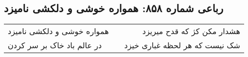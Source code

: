 \begin{center}
\section*{رباعی شماره ۸۵۸: همواره خوشی و دلکشی نامیزد}
\label{sec:0858}
\begin{longtable}{l p{0.5cm} r}
همواره خوشی و دلکشی نامیزد
&&
هشدار مکن کژ که قدح میریزد
\\
در عالم باد خاک بر سر کردن
&&
شک نیست که هر لحظه غباری خیزد
\\
\end{longtable}
\end{center}
